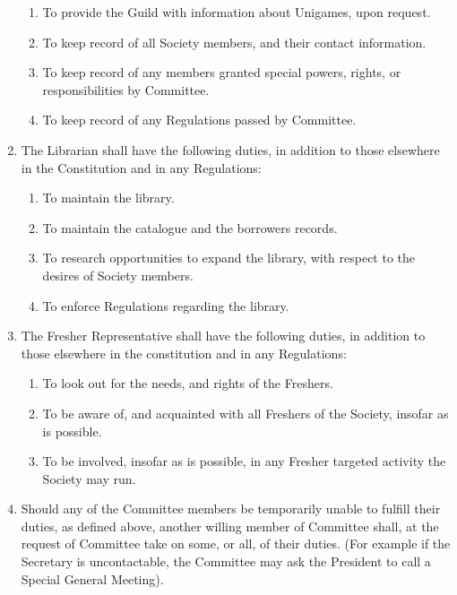 \documentclass[a4paper]{article}
\begin{document}
\begin{enumerate}
\begin{enumerate}
              \item To provide the Guild with information about Unigames, upon request.
              \item To keep record of all Society members, and their contact information.
              \item To keep record of any members granted special powers, rights, or responsibilities by Committee.
              \item To keep record of any Regulations passed by Committee.
          \end{enumerate}
    \item The Librarian shall have the following duties, in addition to those elsewhere in the Constitution and in any Regulations:
          \begin{enumerate}
              \item To maintain the library.
              \item To maintain the catalogue and the borrowers records.
              \item To research opportunities to expand the library, with respect to the desires of Society members.
              \item To enforce Regulations regarding the library.
          \end{enumerate}
    \item The Fresher Representative shall have the following duties, in addition to those elsewhere in the constitution and in any Regulations:
          \begin{enumerate}
              \item To look out for the needs, and rights of the Freshers.
              \item To be aware of, and acquainted with all Freshers of the Society, insofar as is possible.
              \item To be involved, insofar as is possible, in any Fresher targeted activity the Society may run.
          \end{enumerate}
    \item Should any of the Committee members be temporarily unable to fulfill their duties, as defined above, another willing member of Committee shall, at the request of Committee take on some, or all, of their duties. (For example if the Secretary is uncontactable, the Committee may ask the President to call a Special General Meeting).
\end{enumerate}
\end{document}
